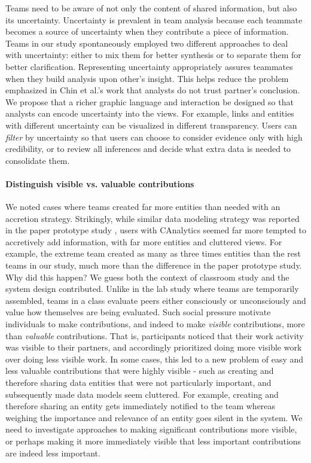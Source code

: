 Teams need to be aware of not only the content of shared information, but also
its uncertainty. Uncertainty is prevalent in team analysis because each teammate becomes a source of uncertainty when they contribute a piece of information. Teams in our study spontaneously employed two different approaches to
deal with uncertainty: either to mix them for better synthesis or to
separate them for better clarification. Representing uncertainty appropriately assures teammates when they build analysis upon other's insight. This helps reduce the problem emphasized in Chin et al.'s work \cite{Chin2009} that analysts do not trust partner's conclusion. We propose that a richer graphic
language and interaction be designed so that analysts can encode uncertainty
into the views. For example, links and entities with different
uncertainty can be visualized in different transparency. Users can \emph{filter}
by uncertainty so that users can choose to consider evidence only with high credibility, or to review
all inferences and decide what extra data is needed to consolidate them.

\paragraph{Distinguish visible vs. valuable contributions}

We noted cases where teams created far more entities than needed
with an accretion strategy.
Strikingly, while similar data modeling strategy was reported in the paper prototype
study \cite{Carroll2013}, users with CAnalytics seemed far more
tempted to accretively add information, with far more entities and
cluttered views. For example, the extreme team created as many as three times entities than the rest teams in our study, much more than the difference in the paper prototype study. Why did this
happen? We guess both the context of classroom study and the system
design contributed. Unlike in the lab study where teams are temporarily
assembled, teams in a class evaluate peers either consciously or
unconsciously and value how themselves are being evaluated. Such social
pressure motivate individuals to make contributions, and indeed to make
\emph{visible} contributions, more than \emph{valuable} contributions. That is,
participants noticed that their work activity was visible to their
partners, and accordingly prioritized doing more visible work over doing
less visible work. In some cases, this led to a new problem of easy and
less valuable contributions that were highly visible - such as creating
and therefore sharing data entities that were not particularly
important, and subsequently made data models seem cluttered. For
example, creating and therefore sharing an entity gets immediately
notified to the team whereas weighing the importance and relevance of an
entity goes silent in the system. We need to investigate approaches to
making significant contributions more visible, or perhaps making it more
immediately visible that less important contributions are indeed less
important.


